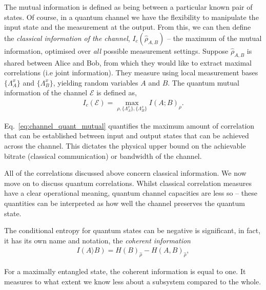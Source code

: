 The mutual information is defined as being between a particular known pair of states. Of course, in a quantum channel we have the flexibility to manipulate the input state and the measurement at the output. From this, we can then define the \textit{classical information of the channel}, $I_c(\hat\rho_{A,B})$ -- the maximum of the mutual information, optimised over \textit{all} possible measurement settings. Suppose $\hat\rho_{A,B}$ is shared between Alice and Bob, from which they would like to extract maximal correlations (i.e joint information). They measure using local measurement bases $\{\Lambda_A^x\}$ and $\{\Lambda_B^x\}$, yielding random variables $A$ and $B$. The quantum mutual information of the channel $\mathcal{E}$ is defined as,
\begin{align}
I_c(\mathcal{E}) = \max_{\rho,\{\Lambda_A^x\},\{\Lambda_B^x\}} I(A;B)_\rho. 
\label{eq:channel_quant_mutual}
\end{align}

Eq.~\eqref{eq:channel_quant_mutual} quantifies the maximum amount of correlation that can be established between input and output states that can be achieved across the channel. This dictates the physical upper bound on the achievable bitrate (classical communication) or bandwidth of the channel.


\vspace{5mm}
All of the correlations discussed above concern classical information.
We now move on to discuss quantum correlations. Whilst classical correlation measures have a clear operational meaning, quantum channel capacities are less so -- these quantities can be interpreted as how well the channel preserves the quantum state.

The conditional entropy for quantum states can be negative is significant, in fact, it has its own name and notation, the \textit{coherent information}
\begin{align}
I(A\rangle B) = H(B)_{\hat\rho} - H(A,B)_{\hat\rho},
\end{align}

\noindent For a maximally entangled state, the coherent information is equal to one. It measures to what extent we know less about a subsystem compared to the whole.




